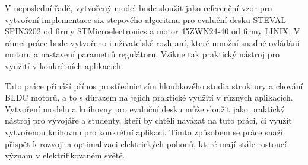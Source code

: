 V neposlední řadě, vytvořený model bude sloužit jako referenční vzor pro vytvoření implementace six-stepového algoritmu pro evaluční 
desku STEVAL-\nobreak{}SPIN3202 od firmy STMicroelectronics a motor 45ZWN24-40 od firmy LINIX. V rámci práce bude vytvořeno i uživatelské rozhraní, které 
umožní snadné ovládání motoru a nastavení parametrů regulátoru. Vzikne tak 
praktický nástroj pro využití v konkrétních aplikacich. 

Tato práce přináší přínos prostřednictvím hloubkového studia struktury a chování BLDC motorů, a to s důrazem na jejich praktické 
využití v různých aplikacích. Vytvoření modelu a knihovny pro evaluční desku může sloužit jako praktický nástroj pro vývojáře a studenty, kteří
by chtěli navázat na tuto práci, či využít vytvořenou knihovnu pro konkrétní aplikaci. Tímto způsobem se práce snaží přispět k rozvoji a optimalizaci elektrických 
pohonů, které mají stále rostoucí význam v elektrifikovaném světě.




